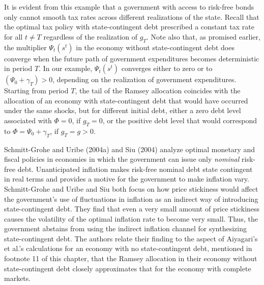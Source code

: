 It is evident from this example that a government with access 
to risk-free bonds only cannot smooth tax rates across  different
realizations of the state. Recall that the optimal tax policy with
state-contingent debt prescribed a constant tax rate for all
$t\not=T$ regardless of the realization of $g_T$. Note also that,
as promised earlier, the multiplier $\Psi_t(s^t)$ in the economy
without state-contingent debt does converge when the future path
of government expenditures becomes deterministic in period $T$. In
our example, $\Psi_t(s^t)$ converges  either to zero or to
$(\Psi_0+\gamma_T)>0$, depending on the realization of government
expenditures. Starting from period $T$, the  tail of the Ramsey
allocation coincides  with the allocation of an economy with
state-contingent debt that would have occurred under the same
shocks, but for different initial debt, either a zero debt level
associated with $\Phi=0$, if $g_T=0$, or the positive
debt level that would correspond to $\Phi = \Psi_0+\gamma_T$, if
$g_T=g>0$.

Schmitt-Grohe and Uribe (2004a) and Siu (2004) analyze optimal
monetary and fiscal policies in economies in which the government
can issue only {\it nominal\/} risk-free debt.  Unanticipated
inflation makes risk-free nominal debt state contingent in real
terms
 and  provides a motive for the government to make inflation
vary. Schmitt-Grohe and Uribe and Siu both focus on how
price stickiness would affect the
 government's use of fluctuations in
inflation as an indirect way of introducing state-contingent
debt.  They find that  even a very small amount of
price stickiness causes the volatility of
the optimal inflation rate to become very small. Thus, the
government abstains from using  the indirect inflation channel for synthesizing
state-contingent debt. The authors relate their finding to the
aspect of Aiyagari's et al.'s calculations for an economy with no
state-contingent debt, mentioned in  footnote 11 of this chapter, that the Ramsey
allocation in their economy without state-contingent debt closely
approximates that for the economy with complete markets.



